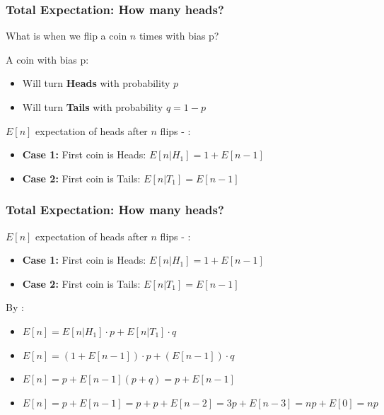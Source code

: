 \documentclass{beamer}
\begin{document}
\begin{frame}
  \frametitle{Total Expectation: How many heads?}

  What is  when we flip a coin $n$
  times with \alert{bias p}?

  \bigskip
  A coin with \alert{bias p}:
  \begin{itemize}
  \item Will turn {\bf Heads} with probability $p$
  \item Will turn {\bf Tails} with probability $q = 1-p$ 
  \end{itemize}

  \vfill
  
  $E[n]$ expectation of heads after $n$ flips - :
  \begin{itemize}
  \item {\bf Case 1:} First coin is Heads: $E[n|H_1] = 1 + E[n-1]$
  \item {\bf Case 2:} First coin is Tails: $E[n|T_1] = E[n-1]$
  \end{itemize}
\end{frame}

\begin{frame}
  \frametitle{Total Expectation: How many heads?}

  $E[n]$ expectation of heads after $n$ flips - :
  \begin{itemize}
  \item {\bf Case 1:} First coin is Heads: $E[n|H_1] = 1 + E[n-1]$
  \item {\bf Case 2:} First coin is Tails: $E[n|T_1] = E[n-1]$
  \end{itemize}

  \bigskip

  By :
  \begin{itemize}
  \item<2-> $E[n] = E[n|H_1]\cdot p + E[n|T_1]\cdot q$
  \item<3-> $E[n] = (1+E[n-1])\cdot p + (E[n-1])\cdot q$
  \item<4-> $E[n] = p + E[n-1](p+q) = p + E[n-1]$
  \item<5-> $E[n] = p + E[n-1] = p + p + E[n-2] = 3p + E[n-3] = np + E[0] = np$
  \end{itemize}
\end{frame}
\end{document}
